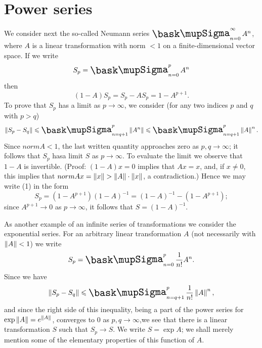 \section{Power series}

We consider next the so-called Neumann series \(\sumx_{n=0}^{\infty} A^n\), where \(A\) is a linear transformation with norm \(<1\) on a finite-dimensional vector space. If we write
\begin{equation*}
    S_p = \sumx_{n=0}^{p} A^n
\end{equation*}
then
\begin{equation}
    (1 - A) S_p = S_p - AS_p = 1 - A^{p+1}.
\end{equation}
To prove that \(S_p\) has a limit as \(p \to \infty\), we consider (for any two indices \(p\) and \(q\) with \(p > q\))
\begin{equation*}
    \norm{S_p - S_q} \leq \sumx_{n = q +1}^p \norm{A^n}
    \leq \sumx_{n = q +1}^p \norm{A}^n.
\end{equation*}
Since \(norm{A} < 1\), the last written quantity approaches zero as \(p, q \to
\infty\); it follows that \(S_p\) hasa limit \(S\) as \(p \to \infty\). To
evaluate the limit we observe that \(1 - A\) is invertible. (Proof: \((1 - A)x =
0\) implies that \(Ax = x\), and, if \(x \neq 0\), this implies that \(norm{Ax}
= \left\lVert x\right\rVert > \left\lVert A\right\rVert \cdot \left\lVert x\right\rVert\), a contradiction.) Hence we may write (1)
in the form
\begin{equation}
    S_p = (1 - A^{p+1})(1 - A)^{-1} = (1 - A)^{-1} - (1 - A^{p+1});
\end{equation}
since \(A^{p+1} \to 0\) as \(p \to \infty\), it follows that \(S = (1 -
A)^{-1}\).

As another example of an infinite series of transformations we consider the
exponential series. For an arbitrary linear transformation \(A\) (not necessarily
with \(\left\lVert A\right\rVert < 1\)) we write
\begin{equation*}
    S_p = \sumx_{n=0}^{p} \frac{1}{n!} A^n.
\end{equation*}
Since we have
\begin{equation*}
    \norm{S_p - S_q} \leq \sumx_{n = q +1}^p \frac{1}{n!} \norm{A}^n,
\end{equation*}
and since the right side of this inequality, being a part of the power series
for \(\exp \left\lVert A\right\rVert = e^{\left\lVert A\right\rVert}\), converges to \(0\) as \(p, q \to
\infty\),we see that there is a linear transformation \(S\) such that \(S_p \to
S\). We write \(S = \exp A\); we shall merely mention some of the elementary
properties of this function of \(A\).


